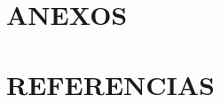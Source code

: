 \documentclass[
]{article}
\begin{document}
\newpage

\section{ANEXOS}




\newpage

\section{REFERENCIAS}
\end{document}

